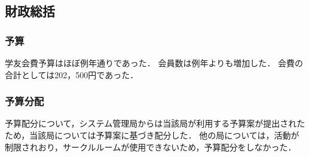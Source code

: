\subsection*{財政総括}



\subsubsection*{予算}
学友会費予算はほぼ例年通りであった．
会員数は例年よりも増加した． 
会費の合計としては202，500円であった．

\subsubsection*{予算分配}
予算配分について，システム管理局からは当該局が利用する予算案が提出されたため，当該局については予算案に基づき配分した．
他の局については，活動が制限されおり，サークルルームが使用できないため，予算配分をしなかった．

